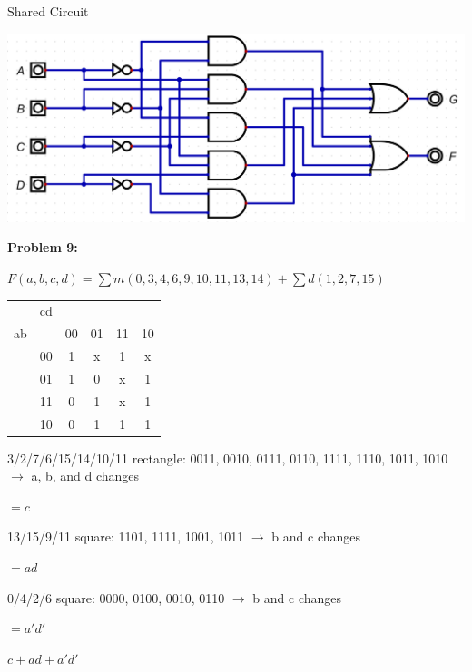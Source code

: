 \documentclass{article}
\begin{document}
    Shared Circuit

    \begin{center}
        \includegraphics[width=\linewidth]{q8f.jpg}
    \end{center}


    \textbf{Problem 9:}

    $F(a,b,c,d) = \sum m (0,3,4,6,9,10,11,13,14) + \sum d(1,2,7,15)$

    \begin{center}
        \begin{tabular} {cc|cccc}
            & cd & &&& \\
            ab && 00 & 01 & 11 & 10 \\
            \hline
            & 00 & 1 & x & 1 & x \\
            & 01 & 1 & 0 & x & 1 \\
            & 11 & 0 & 1 & x & 1 \\
            & 10 & 0 & 1 & 1 & 1 \\
        \end{tabular}
    \end{center}

    3/2/7/6/15/14/10/11 rectangle: 0011, 0010, 0111, 0110, 1111, 1110, 1011, 1010
    $\rightarrow$ a, b, and d changes

    \quad $=c$

    13/15/9/11 square: 1101, 1111, 1001, 1011 $\rightarrow$ b and c changes

    \quad $=ad$

    0/4/2/6 square: 0000, 0100, 0010, 0110 $\rightarrow$ b and c changes

    \quad $=a'd'$

    $\boxed{c+ad+a'd'}$

\end{document}
